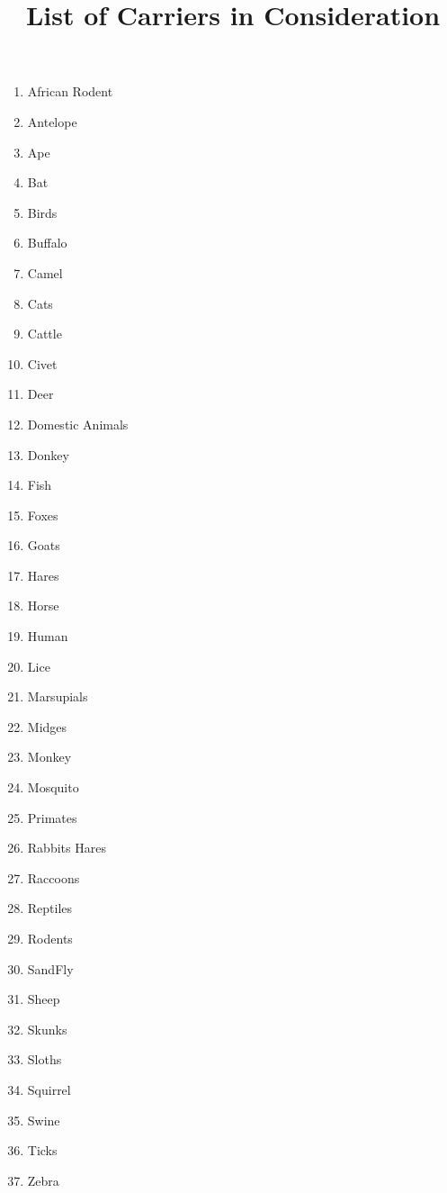 \documentclass{article}
\title{List of Carriers in Consideration}
\date{}
\begin{document}
\maketitle
\begin{multicols}{3}
  \begin{enumerate}
    \item African Rodent
    \item Antelope
    \item Ape
    \item Bat
    \item Birds
    \item Buffalo
    \item Camel
    \item Cats
    \item Cattle
    \item Civet
    \item Deer
    \item Domestic Animals
    \item Donkey
    \item Fish
    \item Foxes
    \item Goats
    \item Hares
    \item Horse
    \item Human
    \item Lice
    \item Marsupials
    \item Midges
    \item Monkey
    \item Mosquito
    \item Primates
    \item Rabbits Hares
    \item Raccoons
    \item Reptiles
    \item Rodents
    \item SandFly
    \item Sheep
    \item Skunks
    \item Sloths
    \item Squirrel
    \item Swine
    \item Ticks
    \item Zebra
  \end{enumerate}
\end{multicols}
\end{document}
